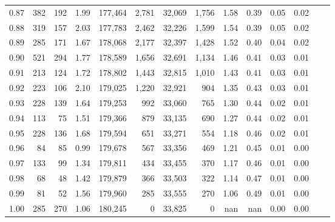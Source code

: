 \begin{tabular}{rrrrrrrrrrrrrr}
0.87 &    382 &  192 &    1.99 &  177,464 &    2,781 &  32,069 &   1,756 &  1.58 &  0.39 &  0.05 &      0.02 \\
0.88 &    319 &  157 &    2.03 &  177,783 &    2,462 &  32,226 &   1,599 &  1.54 &  0.39 &  0.05 &      0.02 \\
0.89 &    285 &  171 &    1.67 &  178,068 &    2,177 &  32,397 &   1,428 &  1.52 &  0.40 &  0.04 &      0.02 \\
0.90 &    521 &  294 &    1.77 &  178,589 &    1,656 &  32,691 &   1,134 &  1.46 &  0.41 &  0.03 &      0.01 \\
0.91 &    213 &  124 &    1.72 &  178,802 &    1,443 &  32,815 &   1,010 &  1.43 &  0.41 &  0.03 &      0.01 \\
0.92 &    223 &  106 &    2.10 &  179,025 &    1,220 &  32,921 &     904 &  1.35 &  0.43 &  0.03 &      0.01 \\
0.93 &    228 &  139 &    1.64 &  179,253 &      992 &  33,060 &     765 &  1.30 &  0.44 &  0.02 &      0.01 \\
0.94 &    113 &   75 &    1.51 &  179,366 &      879 &  33,135 &     690 &  1.27 &  0.44 &  0.02 &      0.01 \\
0.95 &    228 &  136 &    1.68 &  179,594 &      651 &  33,271 &     554 &  1.18 &  0.46 &  0.02 &      0.01 \\
0.96 &     84 &   85 &    0.99 &  179,678 &      567 &  33,356 &     469 &  1.21 &  0.45 &  0.01 &      0.00 \\
0.97 &    133 &   99 &    1.34 &  179,811 &      434 &  33,455 &     370 &  1.17 &  0.46 &  0.01 &      0.00 \\
0.98 &     68 &   48 &    1.42 &  179,879 &      366 &  33,503 &     322 &  1.14 &  0.47 &  0.01 &      0.00 \\
0.99 &     81 &   52 &    1.56 &  179,960 &      285 &  33,555 &     270 &  1.06 &  0.49 &  0.01 &      0.00 \\
1.00 &    285 &  270 &    1.06 &  180,245 &        0 &  33,825 &       0 &   nan &   nan &  0.00 &      0.00 \\
\bottomrule
\end{tabular}
